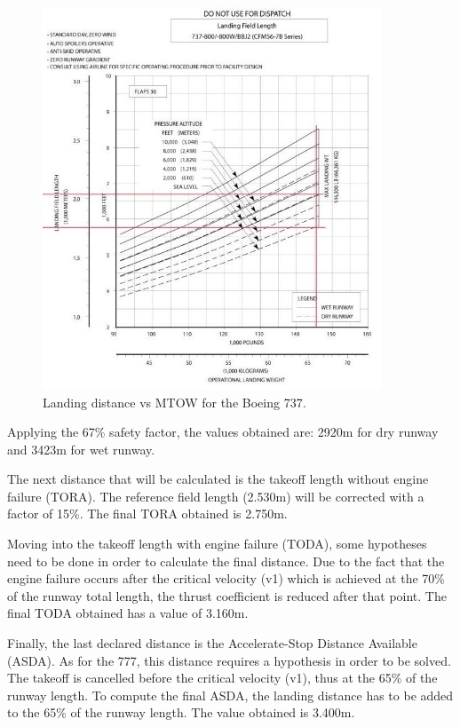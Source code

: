 		\begin{figure}[H]
			\centering
			\includegraphics[clip, trim=0cm 0cm 0cm 0cm, width=0.9\textwidth]{./images/B737/landingdistance737}
			\caption{Landing distance vs MTOW for the Boeing 737.}
			\label{} %
		\end{figure}
	
	Applying the 67\% safety factor, the values obtained are:  2920m for dry runway and 3423m for wet runway.
	
	The next distance that will be calculated is the takeoff length without engine failure (TORA). The reference field length (2.530m) will be corrected with a factor of 15\%.  The final TORA obtained is 2.750m.
	
	Moving into the takeoff length with engine failure (TODA), some hypotheses need to be done in order to calculate the final distance.  Due to the fact that the engine failure occurs after the critical velocity (v1) which is achieved at the 70\% of the runway total length, the thrust coefficient is reduced after that point. The final TODA obtained has a value of 3.160m.
	
	Finally, the last declared distance is the Accelerate-Stop Distance Available (ASDA). As for the 777, this distance requires a hypothesis in order to be solved. The takeoff is cancelled before the critical velocity (v1), thus at the 65\% of the runway length. To compute the final ASDA, the landing distance has to be added to the 65\% of the runway length. The value obtained is 3.400m.     
	
